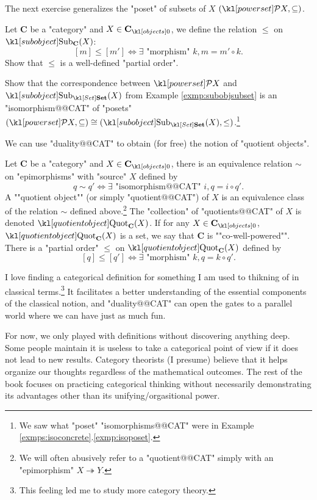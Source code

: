 \documentclass[main.tex]{subfiles}
\begin{document}
The next exercise generalizes the "poset" of subsets of $X$ $(\mP X, \subseteq)$.
\begin{exer}\label{exer:duality:posetsubobj}
	Let $\mathbf{C}$ be a "category" and $X \in \obj{\mathbf{C}}$, we define the relation $\leq$ on $\Sub_{\mathbf{C}}(X)$: 
	\[[m] \leq [m'] \Leftrightarrow \exists \text{ "morphism" } k,  m = m' \circ k.\]
	Show that $\leq$ is a well-defined "partial order".
\end{exer}
\begin{exer}\label{exer:duality:posetsubset}
	Show that the correspondence between $\mP X$ and $\Sub_{\catSet}(X)$ from Example \ref{exmp:subobjsubset} is an "isomorphism@@CAT" of "posets" $(\mP X, \subseteq) \cong (\Sub_{\catSet}(X), \leq)$.\footnote{We saw what "poset" "isomorphisms@@CAT" were in Example \ref{exmps:isoconcrete}.\ref{exmp:isoposet}.}
\end{exer}
We can use "duality@@CAT" to obtain (for free) the notion of "quotient objects".
\begin{defn}[Quotients]
	Let $\mathbf{C}$ be a "category" and $X \in \obj{\mathbf{C}}$, there is an equivalence relation $\sim$ on "epimorphisms" with "source" $X$ defined by \[q \sim q' \Leftrightarrow \exists \text{ "isomorphism@@CAT" } i,  q = i \circ q'.\]
	\AP A ""quotient object"" (or simply "quotient@@CAT") of $X$ is an equivalence class of the relation $\sim$ defined above.\footnote{We will often abusively refer to a "quotient@@CAT" simply with an "epimorphism" $X \twoheadrightarrow Y$.} The "collection" of "quotients@@CAT" of $X$ is denoted $\Quot_{\mathbf{C}}(X)$. \AP If for any $X \in \obj{\mathbf{C}}$, $\Quot_{\mathbf{C}}(X)$ is a set, we say that $\mathbf{C}$ is ""co-well-powered"". There is a "partial order" $\leq$ on $\Quot_{\mathbf{C}}(X)$ defined by 
	\[[q] \leq [q'] \Leftrightarrow \exists \text{ "morphism" } k,  q = k \circ q'.\]
\end{defn}

I love finding a categorical definition for something I am used to thikning of in classical terms.\footnote{This feeling led me to study more category theory.} It facilitates a better understanding of the essential components of the classical notion, and "duality@@CAT" can open the gates to a parallel world where we can have just as much fun.

For now, we only played with definitions without discovering anything deep. Some people maintain it is useless to take a categorical point of view if it does not lead to new results. Category theorists (I presume) believe that it helps organize our thoughts regardless of the mathematical outcomes. The rest of the book focuses on practicing categorical thinking without necessarily demonstrating its advantages other than its unifying/orgasitional power.
\end{document}
